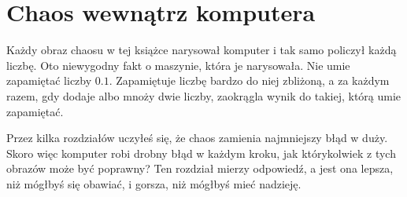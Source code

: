 
\chapter{Chaos wewnątrz komputera}
\label{ch:computers}

\noindent
Każdy obraz chaosu w tej książce narysował komputer i tak samo policzył
każdą liczbę. Oto niewygodny fakt o maszynie, która je narysowała. Nie umie
zapamiętać liczby $\num{0.1}$. Zapamiętuje liczbę bardzo do niej zbliżoną, a
za każdym razem, gdy dodaje albo mnoży dwie liczby, zaokrągla wynik do
takiej, którą umie zapamiętać.

Przez kilka rozdziałów uczyłeś się, że chaos zamienia najmniejszy błąd w
duży. Skoro więc komputer robi drobny błąd w każdym kroku, jak którykolwiek
z tych obrazów może być poprawny? Ten rozdział mierzy odpowiedź, a jest ona
lepsza, niż mógłbyś się obawiać, i gorsza, niż mógłbyś mieć nadzieję.

\begin{outcomes}
\end{outcomes}


